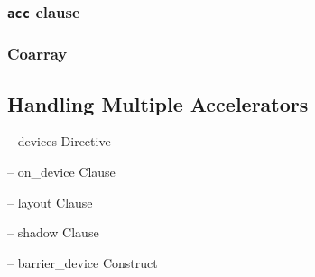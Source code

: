 \subsubsection{{\tt acc} clause}

\subsubsection{Coarray}

\subsection{Handling Multiple Accelerators}

 -- devices Directive

 -- on\_device Clause

 -- layout Clause

 -- shadow Clause

 -- barrier\_device Construct
